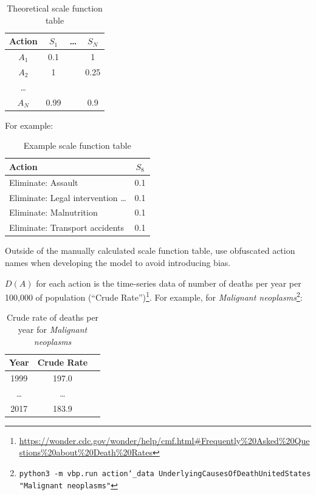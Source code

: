 \documentclass[12pt, a4paper, twocolumn]{article}
\begin{document}
\begin{table}[H]
\centering
\begin{tabular}{cccc}
\toprule
Action & $S_1$  & \ldots & $S_N$  \\
\midrule
$A_1$  & 0.1    &        & 1      \\
$A_2$  & 1      &        & 0.25   \\
\ldots &        &        &        \\
$A_N$  & 0.99   &        & 0.9    \\
\bottomrule
\end{tabular}
\caption{Theoretical scale function table}
\label{table:scaletable}
\end{table}

For example:

\begin{table}[H]
\centering
\begin{tabular}{lc}
\toprule
Action                               & $S_8$ \\
\midrule
Eliminate: Assault                   & 0.1   \\
Eliminate: Legal intervention \ldots & 0.1   \\
Eliminate: Malnutrition              & 0.1   \\
Eliminate: Transport accidents       & 0.1   \\
\bottomrule
\end{tabular}
\caption{Example scale function table}
\label{table:exscaletable}
\end{table}

Outside of the manually calculated scale function table, use obfuscated action names when developing the model to avoid introducing bias.

$D(A)$ for each action is the time-series data of number of deaths per year per 100,000 of population (\enquote{Crude Rate})\footnote{\url{https://wonder.cdc.gov/wonder/help/cmf.html\#Frequently\%20Asked\%20Questions\%20about\%20Death\%20Rates}}. For example, for \textit{Malignant neoplasms}\footnote{\texttt{python3 -m vbp.run action\char`_data UnderlyingCausesOfDeathUnitedStates "Malignant neoplasms"}}:

\begin{table}[H]
\centering
\begin{tabular}{ccc}
\toprule
Year    & Crude Rate \\
\midrule
1999    &      197.0 \\
\ldots  & \ldots     \\
2017    &      183.9 \\
\bottomrule
\end{tabular}
\caption{Crude rate of deaths per year for \textit{Malignant neoplasms}}
\label{table:daa1}
\end{table}
\end{document}
